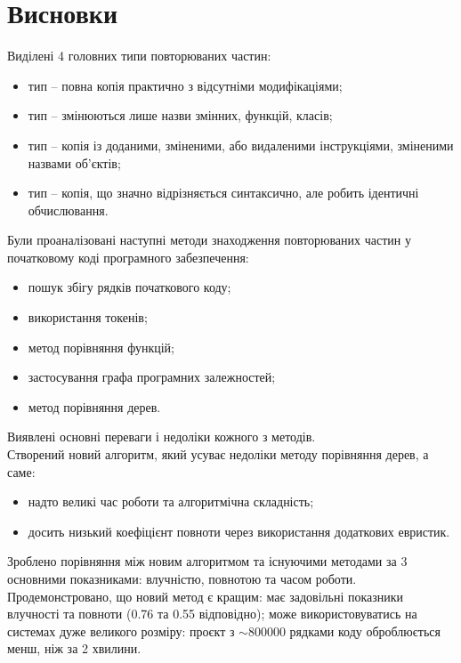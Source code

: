 \documentclass[a4paper, 14pt]{article}
\newcommand{\RNum}[1]{\uppercase\expandafter{\romannumeral #1\relax}}
\begin{document}
\section*{\textbf{Висновки}}
Виділені 4 головних типи повторюваних частин:
\begin{itemize}
\item \RNum{1} тип -- повна копія практично з відсутніми модифікаціями;
\item \RNum{2} тип -- змінюються лише назви змінних, функцій, класів;
\item \RNum{3} тип -- копія із доданими, зміненими, або видаленими інструкціями, зміненими назвами об'єктів;
\item \RNum{4} тип -- копія, що значно відрізняється синтаксично, але робить ідентичні обчислювання.
\end{itemize}
Були проаналізовані наступні методи знаходження повторюваних частин у початковому коді програмного забезпечення:
\begin{itemize}
\item пошук збігу рядків початкового коду;
\item використання токенів;
\item метод порівняння функцій;
\item застосування графа програмних залежностей;
\item метод порівняння дерев.
\end{itemize} 
Виявлені основні переваги і недоліки кожного з методів. \\ 
Створений новий алгоритм, який усуває недоліки методу порівняння дерев, а саме:
\begin{itemize}
\item надто великі час роботи та алгоритмічна складність;
\item досить низький коефіцієнт повноти через використання додаткових евристик.
\end{itemize}
Зроблено порівняння між новим алгоритмом та існуючими методами за 3 основними показниками: влучністю, повнотою та часом роботи. \\
Продемонстровано, що новий метод є кращим: має задовільні показники влучності та повноти (0.76 та 0.55 відповідно); може використовуватись на системах дуже великого розміру: проєкт з $\sim$800000 рядками коду оброблюється менш, ніж за 2 хвилини.
\newpage
{}
\printbibliography[title={\textbf{список використаних джерел}}]
\end{document}
